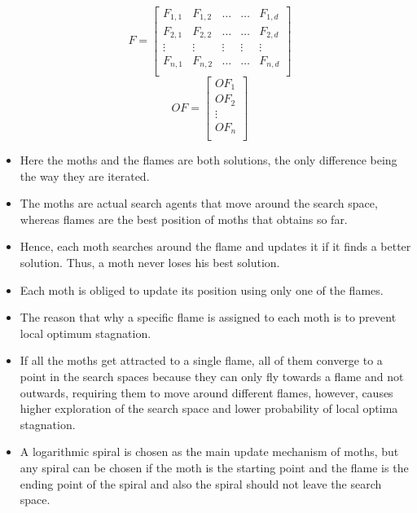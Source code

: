 \documentclass[12pt,a4paper]{report}
\begin{document}
\begin{itemize}
$$
F =
\begin{bmatrix} 
F_{1,1} & F_{1,2} & \dots & \dots & F_{1,d} \\
F_{2,1} & F_{2,2} & \dots & \dots & F_{2,d}\\
\vdots  & \vdots  & \vdots & \vdots &\vdots\\
F_{n,1} & F_{n,2} & \dots & \dots & F_{n,d} \\
\end{bmatrix}
\quad
$$
\vspace{25pt}
$$
OF = 
\begin{bmatrix} 
OF_{1}\\
OF_{2}\\
\vdots\\
OF_{n}\\
\end{bmatrix}
\quad
$$

\item Here the moths and the flames are both solutions, the only difference being the way they are iterated. 

\item The moths are actual search agents that move around the search space, whereas flames are the best position of moths that obtains so far. 

\item Hence, each moth searches around the flame and updates it if it finds a better solution. Thus, a moth never loses his best solution.

\item Each moth is obliged to update its position using only one of the flames.

\item The reason that why a specific flame is assigned to each moth is to prevent local optimum stagnation.

\item If all the moths get attracted to a single flame, all of them converge to a point in the search spaces because they can only fly towards a flame and not outwards, requiring them to move around different flames, however, causes higher exploration of the search space and lower probability of local optima stagnation. 

\item A logarithmic spiral is chosen as the main update mechanism of moths, but any spiral can be chosen if the moth is the starting point and the flame is the ending point of the spiral and also the spiral should not leave the search space. 


\end{itemize}
\end{document}
